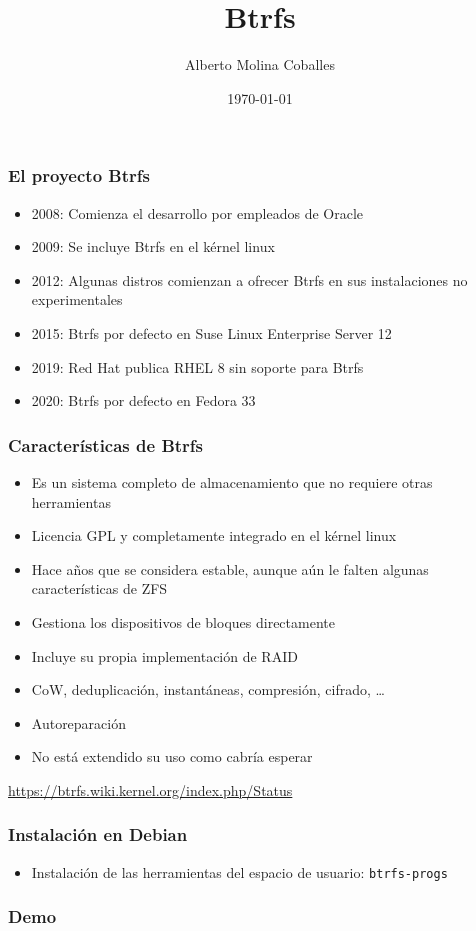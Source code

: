 \documentclass[aspectratio=169]{beamer}
\author{Alberto Molina Coballes}
\title{Btrfs}
\institute{IES Gonzalo Nazareno}
\date{\today}
\begin{document}
\def\braces#1{[#1]}

\begin{frame}[t,plain]
\titlepage
\end{frame}

\begin{frame}
  \frametitle{El proyecto Btrfs}
  \begin{itemize}
  \item 2008: Comienza el desarrollo por empleados de Oracle
  \item 2009: Se incluye Btrfs en el kérnel linux
  \item 2012: Algunas distros comienzan a ofrecer Btrfs en sus instalaciones no experimentales
  \item 2015: Btrfs por defecto en Suse Linux Enterprise Server 12
  \item 2019: Red Hat publica RHEL 8 sin soporte para Btrfs
  \item 2020: Btrfs por defecto en Fedora 33
  \end{itemize}
\end{frame}

\begin{frame}
  \frametitle{Características de Btrfs}
  \begin{itemize}
  \item Es un sistema completo de almacenamiento que no requiere
    otras herramientas
  \item Licencia GPL y completamente integrado en el kérnel linux
  \item Hace años que se considera estable, aunque aún le falten
    algunas características de ZFS
  \item Gestiona los dispositivos de bloques directamente
  \item Incluye su propia implementación de RAID
  \item CoW, deduplicación, instantáneas, compresión, cifrado, \ldots
  \item Autoreparación
  \item No está extendido su uso como cabría esperar
  \end{itemize}
  \small{\url{https://btrfs.wiki.kernel.org/index.php/Status}}
\end{frame}

\begin{frame}
  \frametitle{Instalación en Debian}
  \begin{itemize}
  \item Instalación de las herramientas del espacio de usuario: \texttt{btrfs-progs}
  \end{itemize}
\end{frame}

\begin{frame}
  \frametitle{Demo}
\end{frame}
\end{document}
